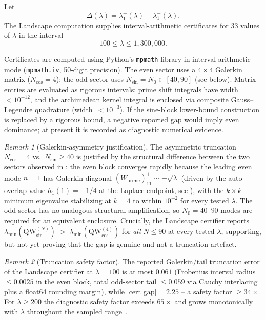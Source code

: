 \documentclass[11pt,a4paper]{article}
\theoremstyle{remark}
\newtheorem{remark}[remark]{Remark}
\theoremstyle{plain}
\begin{document}
Let
\[
  \Delta(\lambda)=\lambda_1^+(\lambda)-\lambda_1^-(\lambda).
\]
The Landscape computation supplies interval-arithmetic certificates for
$33$ values of $\lambda$ in the interval
\[
  100\leq\lambda\leq 1{,}300{,}000.
\]
\begin{sloppypar}
Certificates are computed using Python's \texttt{mpmath} library in interval-arithmetic
mode (\texttt{mpmath.iv}, 50-digit precision). The even sector uses a $4\times 4$
Galerkin matrix ($N_{\cos}=4$); the odd sector uses $N_{\sin}=N_0\in[40,90]$
(see  below). Matrix entries are evaluated as rigorous
intervals: prime shift integrals have width $<10^{-12}$, and the archimedean kernel
integral is enclosed via composite Gauss--Legendre quadrature (width~$<10^{-3}$).
If the sine-block lower-bound construction is replaced by a rigorous bound,
a negative reported gap would imply even dominance; at present it is recorded
as diagnostic numerical evidence.
\end{sloppypar}

\begin{remark}[Galerkin-asymmetry justification]
\label{rem:galerkin-asymmetry}
The asymmetric truncation $N_{\cos}=4$ vs.\ $N_{\sin}\geq 40$ is justified by
the structural difference between the two sectors observed in
\cite[Section~2.4 and Remark on low-mode dominance]{GeigerLandscapeII}: the even
block converges rapidly because the leading even mode $n=1$ has Galerkin diagonal
$(W_{\mathrm{prime}})_{11}^+ \sim -\sqrt\lambda$ (driven by the auto-overlap value
$h_1(1)=-1/4$ at the Laplace endpoint, see ), with the
$k\times k$ minimum eigenvalue stabilizing at $k=4$ to within $10^{-2}$ for every
tested $\lambda$. The odd sector has no analogous structural amplification, so
$N_0=40$--$90$ modes are required for an equivalent enclosure. Crucially, the
Landscape certifier reports
\(
  \lambda_{\min}(\mathrm{QW}_{\sin}^{(N)})\;>\;\lambda_{\min}(\mathrm{QW}_{\cos}^{(4)})
\)
for \emph{all} $N\leq 90$ at every tested $\lambda$, supporting, but not yet
proving that the gap is genuine and not a truncation artefact.
\end{remark}

\begin{remark}[Truncation safety factor]
\label{rem:truncation-safety}
The reported Galerkin/tail truncation error of the Landscape certifier at $\lambda=100$
is at most $0.061$ (Frobenius interval radius $\leq 0.0025$ in the even block, total
odd-sector tail $\leq 0.059$ via Cauchy interlacing plus a float64 rounding margin),
while $|\mathrm{cert\_gap}|=2.25$ -- a safety factor $\geq 34\times$. For $\lambda\geq 200$
the diagnostic safety factor exceeds $65\times$ and grows monotonically with $\lambda$
throughout the sampled range~\cite[Section~2.9 and certificate metadata]{GeigerLandscapeII}.
\end{remark}
\end{document}
